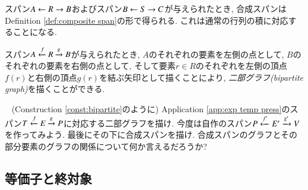 
スパン$A\leftarrow R\rightarrow B$およびスパン$B\leftarrow S\rightarrow C$が与えられたとき, 合成スパンはDefinition \ref{def:composite span}の形で得られる. これは通常の行列の積に対応することになる.

\begin{construction}\label{const:bipartite}


スパン$A\xleftarrow{f} R\xrightarrow{g} B$が与えられたとき, $A$のそれぞれの要素を左側の点として, $B$のそれぞれの要素を右側の点として, そして要素$r\in R$のそれぞれを左側の頂点$f(r)$と右側の頂点$g(r)$を結ぶ矢印として描くことにより, \emph{二部グラフ(bipartite graph)}を描くことができる.

\end{construction}

\begin{exercise}~
\sexc (Construction \ref{const:bipartite}のように) Application \ref{app:exp temp press}のスパン$T\xleftarrow{f}E\xrightarrow{g}P$に対応する二部グラフを描け.
\next 今度は自作のスパン$P\xleftarrow{f'}E'\xrightarrow{g'}V$を作ってみよう. 最後にその下に合成スパンを描け.
\next 合成スパンのグラフとその部分要素のグラフの関係について何か言えるだろうか?
\endsexc
\end{exercise}


\subsection{等価子と終対象}

